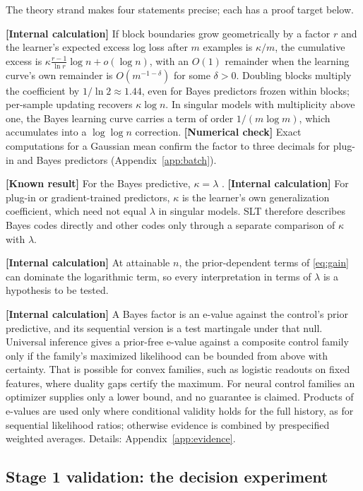 \documentclass[11pt,a4paper]{article}
\newcommand{\evl}[2]{{\small\bfseries\color{#1}[#2]}}
\newcommand{\LKnown}{\evl{cknown}{Known result}}
\newcommand{\LCalc}{\evl{ccalc}{Internal calculation}}
\newcommand{\LNum}{\evl{cnum}{Numerical check}}
\begin{document}
The theory strand makes four statements precise; each has a proof target
below.
\begin{description}[style=nextline,leftmargin=1.5em]
\item[Batching.] \LCalc{} If block boundaries grow geometrically by a
factor $r$ and the learner's expected excess log loss after $m$ examples is
$\kappa/m$, the cumulative excess is $\kappa\frac{r-1}{\ln r}\log n+o(\log n)$, with an $O(1)$ remainder when the learning curve's own remainder is $O(m^{-1-\delta})$ for some $\delta>0$.
Doubling blocks multiply the coefficient by $1/\ln2\approx1.44$, even for
Bayes predictors frozen within blocks; per-sample updating recovers $\kappa\log n$. In singular models with multiplicity above one, the Bayes learning curve carries a term of order $1/(m\log m)$, which accumulates into a $\log\log n$ correction. \LNum{} Exact computations for a Gaussian mean confirm the
factor to three decimals for plug-in and Bayes predictors
(Appendix~\ref{app:batch}).
\item[Learner coefficients.] \LKnown{} For the Bayes predictive,
$\kappa=\lambda$ \cite{watanabe2009}. \LCalc{} For plug-in or
gradient-trained predictors, $\kappa$ is the learner's own generalization
coefficient, which need not equal $\lambda$ in singular models. SLT
therefore describes Bayes codes directly and other codes only through a
separate comparison of $\kappa$ with $\lambda$.
\item[Priors.] \LCalc{} At attainable $n$, the prior-dependent terms of
\eqref{eq:gain} can dominate the logarithmic term, so every interpretation
in terms of $\lambda$ is a hypothesis to be tested.
\item[Tests.] \LCalc{} A Bayes factor is an e-value against the control's
prior predictive, and its sequential version is a test martingale under
that null. Universal inference gives a prior-free e-value against a
composite control family only if the family's maximized likelihood can be
bounded from above with certainty. That is possible for convex families,
such as logistic readouts on fixed features, where duality gaps certify
the maximum. For neural control families an optimizer supplies only a
lower bound, and no guarantee is claimed. Products of e-values are used only where conditional validity holds for the full history, as for sequential likelihood ratios; otherwise evidence is combined by prespecified weighted averages. Details: Appendix~\ref{app:evidence}.
\end{description}

\subsection{Stage 1 validation: the decision experiment}
\end{document}
